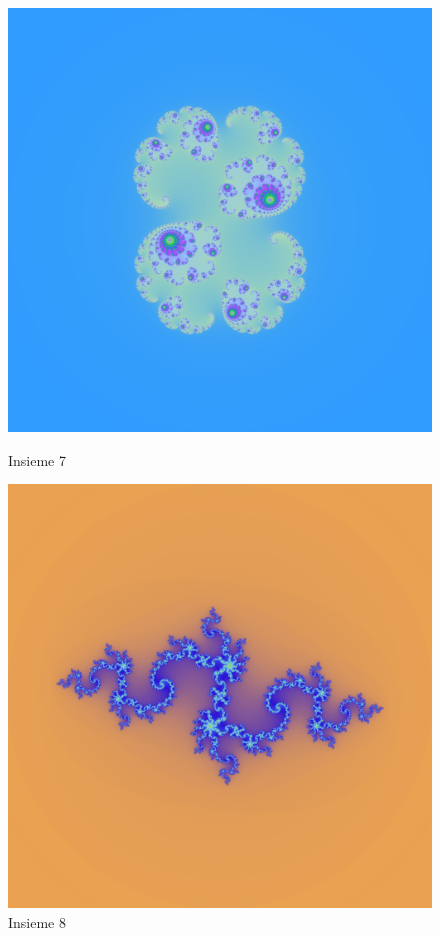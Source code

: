 \documentclass[10pt]{report}
\begin{document}
				\begin{figure}[H]
					\centering
					\includegraphics[width=0.5\linewidth]{"Insieme di Julia/cosa44_2"}
					\caption*{ \footnotesize{Insieme 7} }
					\label{fig:julia7}
					\endminipage \hfill
					\centering
					\includegraphics[width=0.5\linewidth]{"Insieme di Julia/cosa48"}
					\caption*{ \footnotesize{Insieme 8} }
					\label{fig:julia8}
					\endminipage \hfill
				\end{figure}
\end{document}
